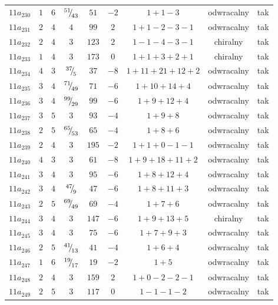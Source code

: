 \begin{longtable}{ccccccccc}
$11a_{230}$ & $1$ & $6$ & ${}^{51}{\mskip -5mu/\mskip -3mu}_{43}$ & $51$ & $-2$ & $1+1-3$ & odwracalny & tak \\
$11a_{231}$ & $2$ & $4$ & $4$ & $99$ & $2$ & $1+1-2-3-1$ & odwracalny & tak \\
$11a_{232}$ & $2$ & $4$ & $3$ & $123$ & $2$ & $1-1-4-3-1$ & chiralny & tak \\
$11a_{233}$ & $1$ & $4$ & $3$ & $173$ & $0$ & $1+1+3+2+1$ & chiralny & tak \\
$11a_{234}$ & $4$ & $3$ & ${}^{37}{\mskip -5mu/\mskip -3mu}_{5}$ & $37$ & $-8$ & $1+11+21+12+2$ & odwracalny & tak \\
$11a_{235}$ & $3$ & $4$ & ${}^{71}{\mskip -5mu/\mskip -3mu}_{49}$ & $71$ & $-6$ & $1+10+14+4$ & odwracalny & tak \\
$11a_{236}$ & $3$ & $4$ & ${}^{99}{\mskip -5mu/\mskip -3mu}_{29}$ & $99$ & $-6$ & $1+9+12+4$ & odwracalny & tak \\
$11a_{237}$ & $3$ & $5$ & $3$ & $93$ & $-4$ & $1+9+8$ & odwracalny & tak \\
$11a_{238}$ & $2$ & $5$ & ${}^{65}{\mskip -5mu/\mskip -3mu}_{53}$ & $65$ & $-4$ & $1+8+6$ & odwracalny & tak \\
$11a_{239}$ & $2$ & $4$ & $3$ & $195$ & $-2$ & $1+1+0-1-1$ & odwracalny & tak \\
$11a_{240}$ & $4$ & $3$ & $3$ & $61$ & $-8$ & $1+9+18+11+2$ & odwracalny & tak \\
$11a_{241}$ & $3$ & $4$ & $3$ & $95$ & $-6$ & $1+8+12+4$ & odwracalny & tak \\
$11a_{242}$ & $3$ & $4$ & ${}^{47}{\mskip -5mu/\mskip -3mu}_{9}$ & $47$ & $-6$ & $1+8+11+3$ & odwracalny & tak \\
$11a_{243}$ & $2$ & $5$ & ${}^{69}{\mskip -5mu/\mskip -3mu}_{49}$ & $69$ & $-4$ & $1+7+6$ & odwracalny & tak \\
$11a_{244}$ & $3$ & $4$ & $3$ & $147$ & $-6$ & $1+9+13+5$ & chiralny & tak \\
$11a_{245}$ & $3$ & $4$ & $3$ & $75$ & $-6$ & $1+7+9+3$ & odwracalny & tak \\
$11a_{246}$ & $2$ & $5$ & ${}^{41}{\mskip -5mu/\mskip -3mu}_{13}$ & $41$ & $-4$ & $1+6+4$ & odwracalny & tak \\
$11a_{247}$ & $1$ & $6$ & ${}^{19}{\mskip -5mu/\mskip -3mu}_{17}$ & $19$ & $-2$ & $1+5$ & odwracalny & tak \\
$11a_{248}$ & $2$ & $4$ & $3$ & $159$ & $2$ & $1+0-2-2-1$ & odwracalny & tak \\
$11a_{249}$ & $2$ & $5$ & $3$ & $117$ & $0$ & $1-1-1-2$ & odwracalny & tak \\

\end{longtable}
